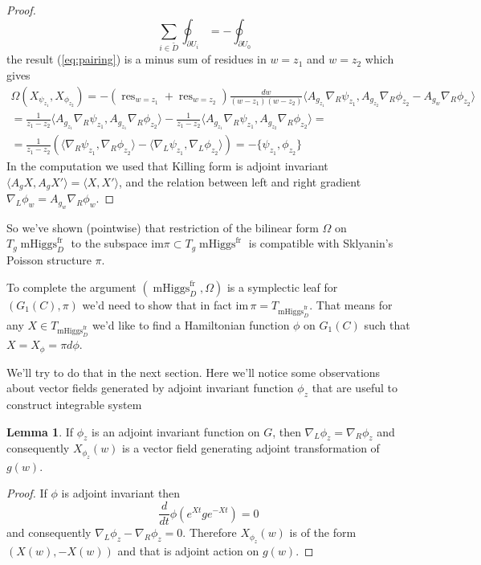 \documentclass[11pt, oneside, reqno]{amsart}
\theoremstyle{definition} \newtheorem{definition}{Definition}[section]
\newtheorem{lemma}[definition]{Lemma}
\theoremstyle{definition} \newtheorem{remark}[definition]{Remark}
\theoremstyle{definition} \newtheorem{remarks}[definition]{Remarks}
\theoremstyle{definition} \newtheorem{question}[definition]{Question}
\theoremstyle{definition} \newtheorem*{note}{Note}
\theoremstyle{definition} \newtheorem{example}[definition]{Example}
\theoremstyle{definition} \newtheorem{examples}[definition]{Examples}
\DeclareMathOperator{\res}{res}
\DeclareMathOperator{\mhiggs}{mHiggs}
\newcommand{\fr}{\mathrm{fr}}
\begin{document}
\begin{proof}
\begin{equation}
  \sum_{i \in \tilde D} \oint_{\partial U_i }  = - \oint_{\partial U_0} 
\end{equation}
the result (\ref{eq:pairing}) is a minus sum of residues in $w = z_1$ and $w = z_2$
which gives
  \begin{multline}
   \Omega(X_{\psi_{z_1}}, X_{\phi_{z_2}}) = - (\res_{w = z_1}  + \res_{w = z_2}) \frac{dw }{(w - z_1)(w - z_2)} \langle A_{g_{z_1}} \nabla_{R} \psi_{z_1},
   A_{g_{z_2}} \nabla_{R} \phi_{z_2}  - A_{g_w} \nabla_{R} \phi_{z_2} \rangle \\
   =   \frac{1}{z_1 - z_2}  \langle A_{g_{z_1}} \nabla_{R} \psi_{z_1} , A_{g_{z_1}} \nabla_{R} \phi_{z_2}\rangle   - \frac{1}{z_1 - z_2}  \langle A_{g_{z_1}} \nabla_{R} \psi_{z_1} , A_{g_{z_2}} \nabla_{R} \phi_{z_2} \rangle =\\
   = \frac{1}{z_1 - z_2} (\langle \nabla_{R} \psi_{z_1} , \nabla_{R} \phi_{z_2}\rangle - 
   \langle  \nabla_{L} \psi_{z_1} , \nabla_{L} \phi_{z_2} \rangle ) =
   - \{\psi_{z_1}, \phi_{z_2} \} 
  \end{multline}
In the computation we used that Killing form is adjoint invariant
$\langle A_{g} X, A_{g} X' \rangle = \langle X, X' \rangle $,
and the relation between left and right gradient $\nabla_{L} \phi_{w} = A_{g_w} \nabla_{R} \phi_w$.
\end{proof}

So we've shown (pointwise) that restriction of the bilinear form $\Omega$ on $T_g\mhiggs^{\fr}_{D}$
  to the subspace $\mathrm{im} \pi \subset T_g\mhiggs^{\fr}$ is compatible with
Sklyanin's Poisson structure $\pi$.

To complete the argument  $(\mhiggs^{\fr}_{D}, \Omega)$ is
a symplectic leaf for $(G_1(C), \pi)$ we'd need to show that in fact
$\mathrm{im} \, \pi = T_{\mhiggs^{\fr}_{D}}$.
That means for any $X \in T_{\mhiggs^{\fr}_{D}} $ we'd like to find a Hamiltonian
function $\phi$ on $G_1(C)$ such that $X = X_{\phi} = \pi d \phi$.

We'll try to do that in the next section. Here we'll notice some observations
about vector fields generated by adjoint invariant function $\phi_z$ that are useful
to construct integrable system 
\begin{lemma}
 If $\phi_z$ is an adjoint invariant function on $G$, then
$\nabla_{L} \phi_z  = \nabla_{R} \phi_z$ and consequently $X_{\phi_z}(w)$ is
a vector field generating adjoint transformation of $g(w)$. 
\end{lemma}
\begin{proof}
  If $\phi$ is adjoint invariant then
  \begin{equation}
    \frac{d}{dt} \phi(e^{Xt} g e^{-Xt}) = 0
  \end{equation}
  and consequently $\nabla_{L} \phi_z - \nabla_{R} \phi_z  = 0$. Therefore $X_{\phi_z}(w)$ is
  of the form $(X(w), -X(w))$ and that is adjoint action on $g(w)$. 
\end{proof}
\end{document}
